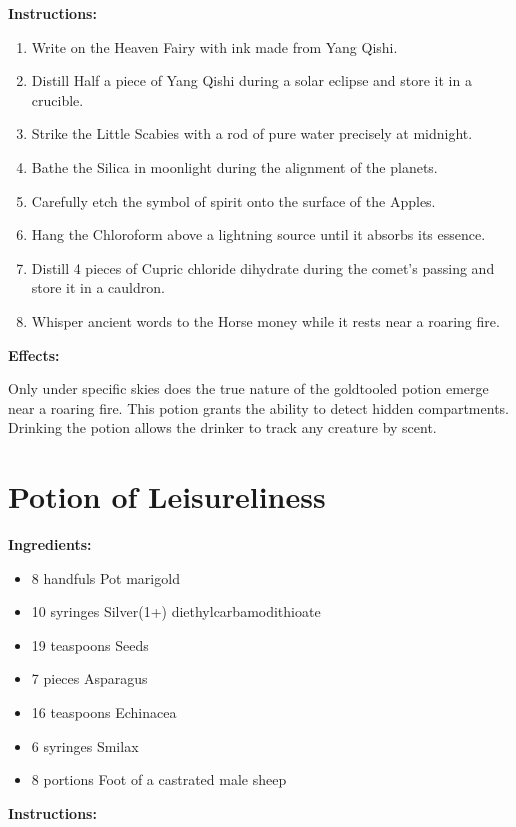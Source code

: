 \documentclass{article}
\begin{document}
\textbf{Instructions:}

\begin{enumerate}
  \item Write on the Heaven Fairy with ink made from Yang Qishi.
  \item Distill Half a piece of Yang Qishi during a solar eclipse and store it in a crucible.
  \item Strike the Little Scabies with a rod of pure water precisely at midnight.
  \item Bathe the Silica in moonlight during the alignment of the planets.
  \item Carefully etch the symbol of spirit onto the surface of the Apples.
  \item Hang the Chloroform above a lightning source until it absorbs its essence.
  \item Distill 4 pieces of Cupric chloride dihydrate during the comet’s passing and store it in a cauldron.
  \item Whisper ancient words to the Horse money while it rests near a roaring fire.
\end{enumerate}

\textbf{Effects:}

Only under specific skies does the true nature of the goldtooled potion emerge near a roaring fire. This potion grants the ability to detect hidden compartments. Drinking the potion allows the drinker to track any creature by scent.

\newpage
\section*{Potion of Leisureliness}

\textbf{Ingredients:}

\begin{itemize}
  \item 8 handfuls Pot marigold
  \item 10 syringes Silver(1+) diethylcarbamodithioate
  \item 19 teaspoons Seeds
  \item 7 pieces Asparagus
  \item 16 teaspoons Echinacea
  \item 6 syringes Smilax
  \item 8 portions Foot of a castrated male sheep
\end{itemize}

\textbf{Instructions:}
\end{document}
